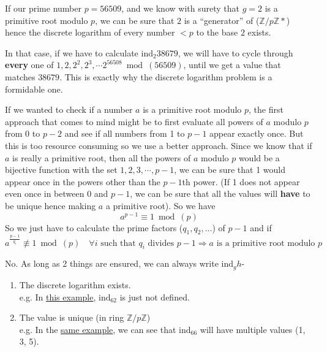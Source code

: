 		\begin{tcolorbox}[breakable, title=Illustration,colback=brown!5!white,colframe=brown!75!black,colbacktitle=yellow!50!red,coltitle=red!25!black,fonttitle=\bfseries,subtitle style={boxrule=0.4pt,colback=yellow!50!red!25!white} ]
			If our prime number \(p = 56509\), and we know with surety that \(g = 2\) is a primitive root modulo \(p\), we can be sure that \(2\) is a ``generator'' of (\(\mathbb{Z} / p \mathbb{Z}*\)) hence the discrete logarithm of every number \(< p\) to the base \(2\) exists.

			In that case, if we have to calculate \(\text{ind}_2{38679}\), we will have to cycle through \textbf{every} one of \(1,2,2^2, 2^3, \cdots 2^{56508} \bmod(56509)\), until we get a value that matches \(38679\). This is exactly why the discrete logarithm problem is a formidable one.
			
				If we wanted to check if a number \(a\) is a primitive root modulo \(p\), the first approach that comes to mind might be to first evaluate all powers of \(a\) modulo \(p\) from 0 to \(p-2\) and see if all numbers from 1 to \(p-1\) appear exactly once. But this is too resource consuming so we use a better approach. 
				Since we know that if \(a\) is really a primitive root, then all the powers of \(a\) modulo \(p\) would be a bijective function with the set \({1, 2, 3, \cdots, p-1}\), we can be sure that 1 would appear once in the powers other than the \(p-1\)th power. (If 1 does not appear even once in between 0 and \(p-1\), we can be sure that all the values will \textbf{have} to be unique hence making \(a\) a primitive root).
				So we have \[a^{p-1} \equiv 1 \bmod(p)\] So we just have to calculate the prime factors (\(q_1, q_2, ...\)) of \(p-1\) and if 
				\[a^{\frac{p-1}{q_i}}\not \equiv 1 \bmod(p) \quad \forall i \text{ such that } q_i \text{ divides } p-1 \Rightarrow a \text{ is a primitive root modulo } p\] 

				No. As long as 2 things are ensured, we can always write \(\text{ind}_g{h}\)-
				\begin{enumerate}
					\item The discrete logarithm exists. \\e.g. In \hyperref[example:six]{this example}, \(\text{ind}_62\) is just not defined.
					\item The value is unique (in ring \(\mathbb{Z}/ p \mathbb{Z}\)) \\ e.g. In the \hyperref[example:six]{same example}, we can see that \(\text{ind}_66\) will have multiple values (1, 3, 5).
				\end{enumerate}
		\end{tcolorbox}


